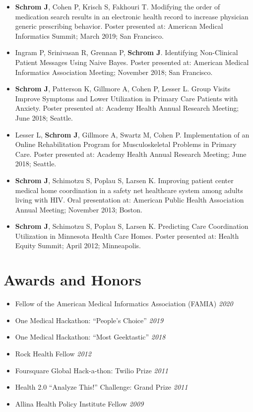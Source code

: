 \documentclass[11pt]{article}
\newcommand{\rside}[1]{
  \hfill {\itshape #1}%
}
\begin{document}
\begin{itemize}
    \item \textbf{Schrom J}, Cohen P, Krisch S, Fakhouri T. Modifying the order of medication search results in an electronic health record to increase physician generic prescribing behavior. Poster presented at: American Medical Informatics Summit; March 2019; San Francisco. 
    \item Ingram P, Srinivasan R, Grennan P, \textbf{Schrom J}. Identifying Non-Clinical Patient Messages Using Naive Bayes. Poster presented at: American Medical Informatics Association Meeting; November 2018; San Francisco.
    \item \textbf{Schrom J}, Patterson K, Gillmore A, Cohen P, Lesser L. Group Visits Improve Symptoms and Lower Utilization in Primary Care Patients with Anxiety. Poster presented at: Academy Health Annual Research Meeting; June 2018; Seattle. 
    \item Lesser L, \textbf{Schrom J}, Gillmore A, Swartz M, Cohen P. Implementation of an Online Rehabilitation Program for Musculoskeletal Problems in Primary Care. Poster presented at: Academy Health Annual Research Meeting; June 2018; Seattle. 
    \item \textbf{Schrom J}, Schimotzu S, Poplau S, Larsen K. Improving patient center medical home coordination in a safety net healthcare system among adults living with HIV. Oral presentation at: American Public Health Association Annual Meeting; November 2013; Boston. 
    \item \textbf{Schrom J}, Schimotzu S, Poplau S, Larsen K. Predicting Care Coordination Utilization in Minnesota Health Care Homes. Poster presented at: Health Equity Summit; April 2012; Minneapolis.
\end{itemize}

\section{Awards and Honors}
\begin{itemize}
    \renewcommand{\labelitemi}{}
    \setlength{\leftskip}{-1.5em}
    \item Fellow of the American Medical Informatics Association (FAMIA) \rside{2020}
    \item One Medical Hackathon: “People’s Choice” \rside{2019}
    \item One Medical Hackathon: “Most Geektastic” \rside{2018}
    \item Rock Health Fellow \rside{2012}
    \item Foursquare Global Hack-a-thon: Twilio Prize \rside{2011}
    \item Health 2.0 “Analyze This!” Challenge: Grand Prize \rside{2011}
    \item Allina Health Policy Institute Fellow \rside{2009}
\end{itemize}
\end{document}
